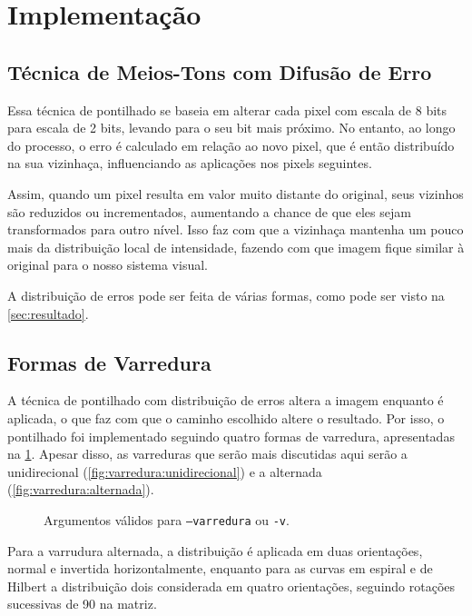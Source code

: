 \section{Implementação} \label{sec:impl}

\subsection{Técnica de Meios-Tons com Difusão de Erro}

    Essa técnica de pontilhado se baseia em alterar cada pixel com escala de 8 bits para escala de 2 bits, levando para o seu bit mais próximo. No entanto, ao longo do processo, o erro é calculado em relação ao novo pixel, que é então distribuído na sua vizinhaça, influenciando as aplicações nos pixels seguintes.

    Assim, quando um pixel resulta em valor muito distante do original, seus vizinhos são reduzidos ou incrementados, aumentando a chance de que eles sejam transformados para outro nível. Isso faz com que a vizinhaça mantenha um pouco mais da distribuição local de intensidade, fazendo com que imagem fique similar à original para o nosso sistema visual.

    A distribuição de erros pode ser feita de várias formas, como pode ser visto na \cref{sec:resultado}.

\subsection{Formas de Varredura} \label{sec:varredura}

    A técnica de pontilhado com distribuição de erros altera a imagem enquanto é aplicada, o que faz com que o caminho escolhido altere o resultado. Por isso, o pontilhado foi implementado seguindo quatro formas de varredura, apresentadas na \cref{fig:varredura}. Apesar disso, as varreduras que serão mais discutidas aqui serão a unidirecional (\ref{fig:varredura:unidirecional}) e a alternada (\ref{fig:varredura:alternada}).

    \begin{figure}[H]
        \centering
        

        \caption{Argumentos válidos para \texttt{--varredura} ou \texttt{-v}.}
        \label{fig:varredura}
    \end{figure}

    Para a varrudura alternada, a distribuição é aplicada em duas orientações, normal e invertida horizontalmente, enquanto para as curvas em espiral e de Hilbert a distribuição dois considerada em quatro orientações, seguindo rotações sucessivas de 90\textdegree{} na matriz.

